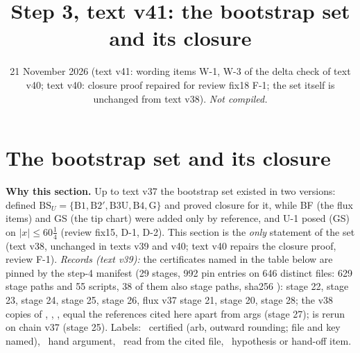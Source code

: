 \documentclass[11pt]{article}
\title{Step 3, text v41: the bootstrap set and its closure}
\author{}\date{21 November 2026 (text v41: wording items W-1, W-3 of the delta check of text v40; text v40: closure proof repaired for review fix18 F-1; the set itself is unchanged from text v38). \emph{Not compiled.}}
\begin{document}
\maketitle
\fi

\section{The bootstrap set and its closure}\label{BS:sec}
\noindent\textbf{Why this section.} Up to text v37 the bootstrap set existed in two versions:  defined $\mathrm{BS}_U=\{\mathrm{B1},\mathrm{B2}',\mathrm{B3U},\mathrm{B4},\mathrm{G}\}$ and proved closure for it, while BF (the flux items) and GS (the tip chart) were added only by reference, and U-1 posed (GS) on $|x|\le60\frac14$ (review fix15, D-1, D-2). This section is the \emph{only} statement of the set (text v38, unchanged in texts v39 and v40; text v40 repairs the closure proof, review  F-1). \emph{Records (text v39):} the certificates named in the table below are pinned by the step-4 manifest  (29 stages, 992 pin entries on 646 distinct files: 629 stage paths and 55 scripts, 38 of them also stage paths, sha256 ):  stage 22,  stage 23,  stage 24,  stage 25,  stage 26, flux v37 stage 21,  stage 20,  stage 28; the v38 copies of , , ,  equal the references cited here apart from args (stage 27);  is rerun on chain v37 (stage 25). Labels: \tC\ certified (arb, outward rounding; file and key named), \tHd\ hand argument, \tR\ read from the cited file, \tH\ hypothesis or hand-off item.
\end{document}

